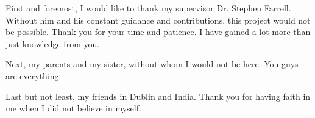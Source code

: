 First and foremost, I would like to thank my supervisor Dr. Stephen Farrell. Without him and his constant guidance and contributions, this project would not be possible. Thank you for your time 
and patience. I have gained a lot more than just knowledge from you.

\noindent Next, my parents and my sister, without whom I would not be here. You guys are everything.

\noindent Last but not least, my friends in Dublin and India. Thank you for having faith in me when I did not believe in myself. 

